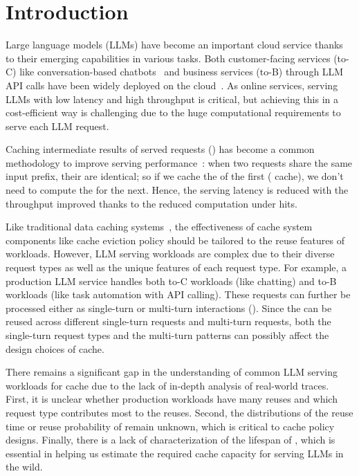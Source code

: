 \section{Introduction}
\label{sec:intro}

\noindent
Large language models (LLMs) have become an important cloud service
thanks to their emerging capabilities in various tasks.
Both customer-facing services (to-C) like conversation-based chatbots~\cite{chatgpt}
and business services (to-B) through LLM API calls have been widely deployed on the cloud~\cite{openaiapi,genimiapi,claudeapi}.
As online services, serving LLMs with low latency and high throughput is critical,
but achieving this in a cost-efficient way is challenging
due to the huge computational requirements to serve each LLM request.

Caching intermediate results of served requests ({\kvcache}) has become a common methodology
to improve serving performance~\cite{openai-cache,claude-cache}:
when two requests share the same input prefix,
their {\kvcache} are identical;
so if we cache the {\kvcache} of the first ({\kvcache} cache),
we don't need to compute the {\kvcache} for the next.
Hence, the serving latency is reduced with the throughput improved
thanks to the reduced computation under hits.

Like traditional data caching systems~\cite{yang2020twemcache,atikoglu2012workload,180324},
the effectiveness of {\kvcache} cache system components 
like cache eviction policy should be tailored to the {\kvcache} reuse features of workloads.
However,
LLM serving workloads are complex due to their diverse request types
as well as the unique features of each request type.
For example, a production LLM service handles both to-C workloads (like chatting)
and to-B workloads (like task automation with API calling).
These requests can further be processed either as single-turn or multi-turn interactions (\textsection{\ref{sec:bg}}).
Since the {\kvcache} can be reused across different single-turn requests and multi-turn requests,
both the single-turn request types and the multi-turn patterns
can possibly affect the design choices of {\kvcache} cache.

There remains a significant gap in the understanding of common LLM serving
workloads for {\kvcache} cache due to the lack of in-depth analysis of real-world traces.
First, it is unclear whether production workloads have many reuses and which request
type contributes most to the reuses.
Second, the distributions of the reuse time or reuse probability of {\kvcache} remain unknown,
which is critical to cache policy designs.
Finally, there is a lack of characterization of the lifespan of {\kvcache},
which is essential in helping us estimate the required cache capacity for serving LLMs in the wild.

